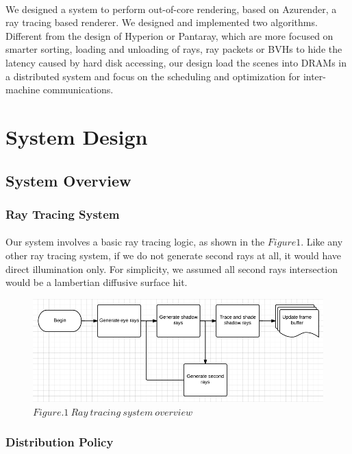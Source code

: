 \documentclass[a4paper, oneside, 10pt]{article}
\begin{document}
\paragraph{} We designed a system to perform out-of-core rendering, based on Azurender, a ray tracing based renderer. We designed and implemented two algorithms. Different from the design of Hyperion or Pantaray, which are more focused on smarter sorting, loading and unloading of rays, ray packets or BVHs to hide the latency caused by hard disk accessing, our design load the scenes into DRAMs in a distributed system and focus on the scheduling and optimization for inter-machine communications. 

\section{System Design}
\subsection{System Overview}
\subsubsection{Ray Tracing System}
\paragraph{} Our system involves a basic ray tracing logic, as shown in the $Figure 1$. Like any other ray tracing system, if we do not generate second rays at all, it would have direct illumination only. For simplicity, we assumed all second rays intersection would be a lambertian diffusive surface hit.
\begin{figure}[h]
\includegraphics[width=\textwidth] {img1}
$Figure. 1\ Ray\ tracing\ system\ overview$
\end{figure}
\subsubsection{Distribution Policy}
\end{document}

